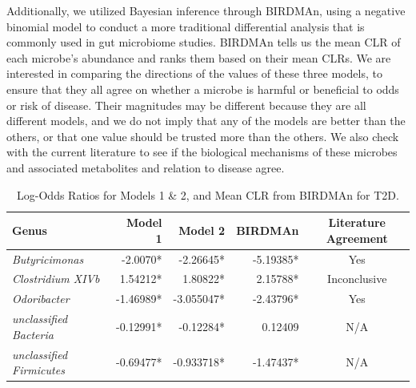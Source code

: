 \documentclass[12pt,letterpaper]{article}
\begin{document}
Additionally, we utilized Bayesian inference through BIRDMAn, using a negative binomial model to conduct a more traditional differential analysis that is commonly used in gut microbiome studies. BIRDMAn tells us the mean CLR of each microbe’s abundance and ranks them based on their mean CLRs. We are interested in comparing the directions of the values of these three models, to ensure that they all agree on whether a microbe is harmful or beneficial to odds or risk of disease. Their magnitudes may be different because they are all different models, and we do not imply that any of the models are better than the others, or that one value should be trusted more than the others. We also check with the current literature to see if the biological mechanisms of these microbes and associated metabolites and relation to disease agree. 

\begin{table}
        
        \centering
        \begin{tabular}{l r r r c}
          \toprule
          \textbf{Genus} & \textbf{Model 1} & \textbf{Model 2} & \textbf{BIRDMAn} & \textbf{Literature Agreement} \\
          \midrule
          \textit{Butyricimonas} & -2.0070* & -2.26645* & -5.19385* & Yes \\
          \textit{Clostridium XIVb} & 1.54212* & 1.80822* & 2.15788* & Inconclusive \\
          \textit{Odoribacter} & -1.46989* & -3.055047* & -2.43796* & Yes \\
          \textit{unclassified Bacteria} & -0.12991* & -0.12284* & 0.12409 & N/A \\
          \textit{unclassified Firmicutes} & -0.69477* & -0.933718* & -1.47437* & N/A \\
          \bottomrule
        \end{tabular}
        \caption{Log-Odds Ratios for Models 1 \& 2, and Mean CLR from BIRDMAn for T2D.}
        \label{table:t2dresults}
      \end{table}
      
\end{document}
